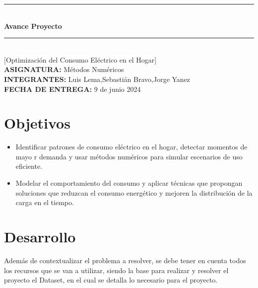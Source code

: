 \documentclass[12pt]{report}
\begin{document}
\thispagestyle{empty}
\vspace*{2cm}
\begin{center}
    \noindent\rule{\textwidth}{0.4pt}\\[0.5cm]
    {\Huge\bfseries Avance Proyecto}\\[0.5cm]
    \noindent\rule{\textwidth}{0.4pt}\\[0.5cm]
    {\large {\colorbox{white}{[Optimización del Consumo Eléctrico en el Hogar]}}}\\[2cm]
    \textbf{ASIGNATURA:} \hspace{1cm} {Métodos Numéricos}\\[0.2cm]
    
    \textbf{INTEGRANTES:} \hspace{1cm} {Luis Lema,Sebastián Bravo,Jorge Yanez}\\[2cm]
    
    \textbf{FECHA DE ENTREGA:} \hspace{0.5cm} {9 de junio 2024}
\end{center}
\newpage


\tableofcontents
\thispagestyle{empty}
\newpage

\setcounter{page}{1}

\section*{Objetivos} 
\begin{itemize}
    \item {Identificar patrones de consumo eléctrico en el hogar, detectar momentos de mayo
    r demanda y usar métodos numéricos para simular escenarios de uso eficiente.}
    \item {Modelar el comportamiento del consumo y aplicar técnicas que propongan soluciones 
    que reduzcan el consumo energético y mejoren la distribución de la carga en el tiempo.}

\end{itemize}

\section*{Desarrollo}
Además de contextualizar el problema a resolver, se debe tener en cuenta todos los recursos que se van a utilizar, siendo la base para realizar y resolver el proyecto el Dataset, en el cual se detalla lo necesario para el proyecto.
\end{document}
